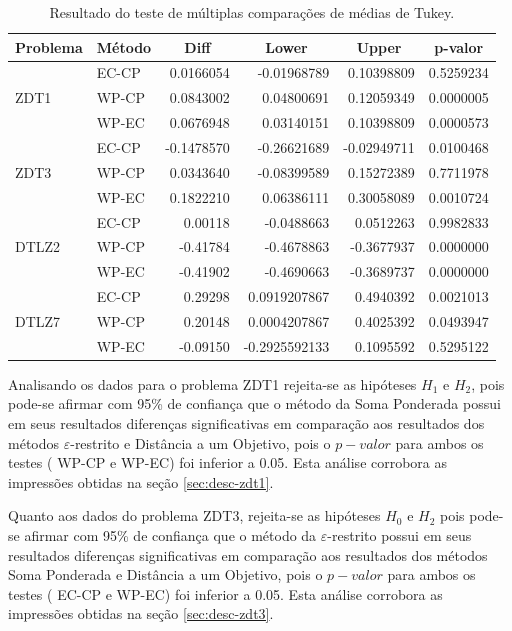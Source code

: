 \begin{table}[!htb]
	\centering
	\caption{Resultado do teste de múltiplas comparações de médias de Tukey.}
	\label{tab:tukey}
	\begin{tabular}{|llrrrr|}
		\toprule
	\textbf{Problema} 	&	\textbf{Método} & \multicolumn{1}{c}{\textbf{Diff}} & \multicolumn{1}{c}{\textbf{Lower}} & \multicolumn{1}{c}{\textbf{Upper}} & \multicolumn{1}{c}{\textbf{p-valor}} \\ \hline
	\multirow{3}{*}{ZDT1}	& EC-CP &  0.0166054 & -0.01968789 &  0.10398809 & 0.5259234 \\
							& WP-CP &  0.0843002 &  0.04800691 &  0.12059349 & 0.0000005 \\
							& WP-EC &  0.0676948 &  0.03140151 &  0.10398809 & 0.0000573 \\ \hline
	\multirow{3}{*}{ZDT3}	& EC-CP & -0.1478570 & -0.26621689 & -0.02949711 & 0.0100468 \\
							& WP-CP &  0.0343640 & -0.08399589 &  0.15272389 & 0.7711978 \\
							& WP-EC &  0.1822210 &  0.06386111 &  0.30058089 & 0.0010724 \\ \hline	
	\multirow{3}{*}{DTLZ2}	& EC-CP &  0.00118 & -0.0488663 &  0.0512263 & 0.9982833 \\ 
							& WP-CP & -0.41784 & -0.4678863 & -0.3677937 & 0.0000000 \\ 
							& WP-EC & -0.41902 & -0.4690663 & -0.3689737 & 0.0000000 \\ \hline							
	\multirow{3}{*}{DTLZ7}  & EC-CP &  0.29298 &  0.0919207867 & 0.4940392  & 0.0021013 \\ 
							& WP-CP &  0.20148 &  0.0004207867 & 0.4025392  & 0.0493947 \\ 
							& WP-EC & -0.09150 & -0.2925592133 & 0.1095592  & 0.5295122 \\ \bottomrule
	
	\end{tabular}
\end{table}

Analisando os dados para o problema ZDT1 rejeita-se as hipóteses $ H_1 $ e $ H_2 $, pois pode-se afirmar com 95\% de confiança que o método da Soma Ponderada possui em seus resultados diferenças significativas em comparação aos resultados dos métodos $ \varepsilon $-restrito e Distância a um Objetivo, pois o $ p-valor $ para ambos os testes ( WP-CP e WP-EC) foi inferior a 0.05. Esta análise corrobora as impressões obtidas na seção \ref{sec:desc-zdt1}.

Quanto aos dados do problema ZDT3, rejeita-se as hipóteses $ H_0 $ e $ H_2 $ pois pode-se afirmar com 95\% de confiança que o método da $ \varepsilon $-restrito possui em seus resultados diferenças significativas em comparação aos resultados dos métodos Soma Ponderada e Distância a um Objetivo, pois o $ p-valor $ para ambos os testes ( EC-CP e WP-EC) foi inferior a 0.05. Esta análise corrobora as impressões obtidas na seção \ref{sec:desc-zdt3}.

